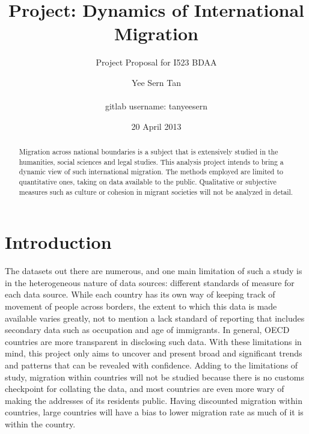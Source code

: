 \documentclass{acm_proc_article-sp}
\begin{document}
\title{Project: Dynamics of International Migration}
\subtitle{Project Proposal for I523 BDAA}

\author{
\alignauthor
Yee Sern Tan\\
       \\
       gitlab username: tanyeesern\\
}

\date{20 April 2013}


\maketitle
\begin{abstract}
Migration across national boundaries is a subject that is extensively studied in the humanities, social sciences and legal studies. This analysis project intends to bring a dynamic view of such international migration. The methods employed are limited to quantitative ones, taking on data available to the public. Qualitative or subjective measures such as culture or cohesion in migrant societies will not be analyzed in detail.
\end{abstract}

\section{Introduction}
The datasets out there are numerous, and one main limitation of such a study is in the heterogeneous nature of data sources: different standards of measure for each data source. While each country has its own way of keeping track of movement of people across borders, the extent to which this data is made available varies greatly, not to mention a lack standard of reporting that includes secondary data such as occupation and age of immigrants.\cite{WorldBank011} In general, OECD countries are more transparent in disclosing such data.\cite{OECD} With these limitations in mind, this project only aims to uncover and present broad and significant trends and patterns that can be revealed with confidence. Adding to the limitations of study, migration within countries will not be studied because there is no customs checkpoint for collating the data, and most countries are even more wary of making the addresses of its residents public. Having discounted migration within countries, large countries will have a bias to lower migration rate as much of it is within the country.
\end{document}

